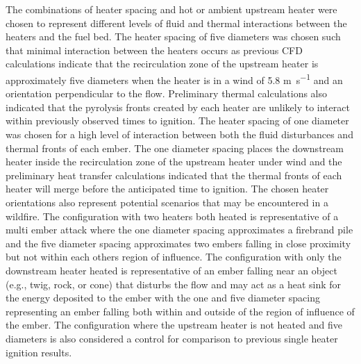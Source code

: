     The combinations of heater spacing and hot or ambient upstream heater were chosen to represent different levels of fluid and thermal interactions between the heaters and the fuel bed. The heater spacing of five diameters was chosen such that minimal interaction between the heaters occurs as previous CFD calculations indicate that the recirculation zone of the upstream heater is approximately five diameters when the heater is in a wind of 5.8 \si{\meter\per\second} and an orientation perpendicular to the flow. Preliminary thermal calculations also indicated that the pyrolysis fronts created by each heater are unlikely to interact within previously observed times to ignition. The heater spacing of one diameter was chosen for a high level of interaction between both the fluid disturbances and thermal fronts of each ember. The one diameter spacing places the downstream heater inside the recirculation zone of the upstream heater under wind and the preliminary heat transfer calculations indicated that the thermal fronts of each heater will merge before the anticipated time to ignition. The chosen heater orientations also represent potential scenarios that may be encountered in a wildfire. The configuration with two heaters both heated is representative of a multi ember attack where the one diameter spacing approximates a firebrand pile and the five diameter spacing approximates two embers falling in close proximity but not within each others region of influence. The configuration with only the downstream heater heated is representative of an ember falling near an object (e.g., twig, rock, or cone) that disturbs the flow and may act as a heat sink for the energy deposited to the ember with the one and five diameter spacing representing an ember falling both within and outside of the region of influence of the ember. The configuration where the upstream heater is not heated and five diameters is also considered a control for comparison to previous single heater ignition results.
    
